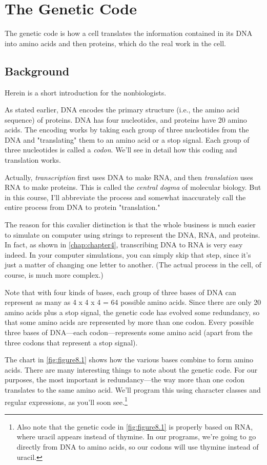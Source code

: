 \section{The Genetic Code}
The genetic code is how a cell translates the information contained in its DNA into amino acids and then proteins, which do the real work in the cell.

\subsection{Background}
Herein is a short introduction for the nonbiologists.

As stated earlier, DNA encodes the primary structure (i.e., the amino acid sequence) of proteins. DNA has four nucleotides, and proteins have 20 amino acids. The encoding works by taking each group of three nucleotides from the DNA and "translating" them to an amino acid or a stop signal. Each group of three nucleotides is called a \textit{codon}. We'll see in detail how this coding and translation works.

Actually, \textit{transcription} first uses DNA to make RNA, and then \textit{translation} uses RNA to make proteins. This is called the \textit{central dogma} of molecular biology. But in this course, I'll abbreviate the process and somewhat inaccurately call the entire process from DNA to protein "translation."

The reason for this cavalier distinction is that the whole business is much easier to simulate on computer using strings to represent the DNA, RNA, and proteins. In fact, as shown in \autoref{chap:chapter4}, transcribing DNA to RNA is very easy indeed. In your computer simulations, you can simply skip that step, since it's just a matter of changing one letter to another. (The actual process in the cell, of course, is much more complex.)

Note that with four kinds of bases, each group of three bases of DNA can represent as many as 4 x 4 x 4 = 64 possible amino acids. Since there are only 20 amino acids plus a stop signal, the genetic code has evolved some redundancy, so that some amino acids are represented by more than one codon. Every possible three bases of DNA—each codon—represents some amino acid (apart from the three codons that represent a stop signal). 

The chart in \autoref{fig:figure8.1} shows how the various bases combine to form amino acids. There are many interesting things to note about the genetic code. For our purposes, the most important is redundancy—the way more than one codon translates to the same amino acid. We'll program this using character classes and regular expressions, as you'll soon see.\footnote{Also note that the genetic code in \autoref{fig:figure8.1} is properly based on RNA, where uracil appears instead of thymine. In our programs, we're going to go directly from DNA to amino acids, so our codons will use thymine instead of uracil.}

